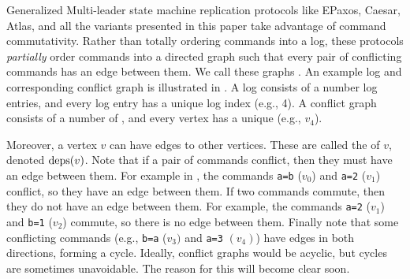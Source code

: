 Generalized Multi-leader state machine replication protocols like EPaxos,
Caesar, Atlas, and all the \BPaxos{} variants presented in this paper take
advantage of command commutativity. Rather than totally ordering commands into
a log, these protocols \emph{partially} order commands into a directed graph
such that every pair of conflicting commands has an edge between them. We call
these graphs . An example log and corresponding
conflict graph is illustrated in . A log consists of a
number log entries, and every log entry has a unique log index (e.g., 4). A
conflict graph consists of a number of , and every vertex has
a unique  (e.g., $v_4$).
%

%
Moreover, a vertex $v$ can have  edges to other
vertices. These are called the  of $v$, denoted
$\text{deps}(v)$. 
Note that if a pair of commands conflict, then they must have an edge between
them.  For example in , the commands
\texttt{a=b} ($v_0$) and \texttt{a=2} ($v_1$) conflict, so they have an edge
between them. If two commands commute, then they do not have an edge between
them.  For example, the commands \texttt{a=2} ($v_1$) and \texttt{b=1} ($v_2$)
commute, so there is no edge between them. Finally note that some conflicting
commands (e.g., \texttt{b=a} ($v_3)$ and \texttt{a=3} $(v_4)$) have edges in
both directions, forming a cycle. Ideally, conflict graphs would be acyclic,
but cycles are sometimes unavoidable. The reason for this will become clear
soon.


